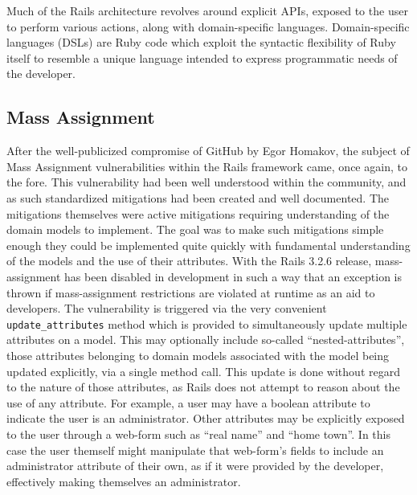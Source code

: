 \documentclass[conference]{IEEEtran}
\begin{document}
Much of the Rails architecture revolves around explicit APIs, exposed to the user to
perform various actions, along with domain-specific languages.  Domain-specific languages
(DSLs) are Ruby code which exploit the syntactic flexibility of Ruby itself to resemble a
unique language intended to express programmatic needs of the developer.

\subsection{Mass Assignment}

After the well-publicized compromise of GitHub by Egor Homakov\cite{egor}, the subject of
Mass Assignment vulnerabilities within the Rails framework came, once again, to the fore.
This vulnerability had been well understood within the community, and as such standardized
mitigations had been created and well documented.  The mitigations themselves were active
mitigations requiring understanding of the domain models to implement.  The goal was to
make such mitigations simple enough they could be implemented quite quickly with
fundamental understanding of the models and the use of their attributes.  With the Rails
3.2.6 release, mass-assignment has been disabled in development in such a way that an exception
is thrown if mass-assignment restrictions are violated at runtime as an aid to developers.
The vulnerability is triggered via the very convenient \texttt{update\_attributes} method
which is provided to simultaneously update multiple attributes on a model.  This may
optionally include so-called ``nested-attributes'', those attributes belonging to domain
models associated with the model being updated explicitly, via a single method call.  This
update is done without regard to the nature of those attributes, as Rails does not attempt
to reason about the use of any attribute.  For example, a user may have a boolean
attribute to indicate the user is an administrator.  Other attributes may be explicitly
exposed to the user through a web-form such as ``real name'' and ``home town''. In this
case the user themself might manipulate that web-form's fields to include an administrator
attribute of their own, as if it were provided by the developer, effectively making
themselves an administrator.
\end{document}
